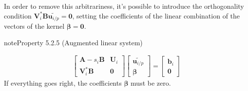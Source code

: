 \documentclass[letterpaper,10pt,english]{jupyterBook}
\begin{document}
\sphinxAtStartPar
In order to remove this arbitrariness, it’s possible to introduce the orthogonality condition \(\mathbf{V}_i^* \mathbf{B} \widetilde{\mathbf{u}_{i/p}} = \mathbf{0}\), setting the coefficients of the linear combination of the vectors of the kernel \(\boldsymbol\beta = \mathbf{0}\).
\label{ch/linear-algebra/spectral-sensitivity:property-4}
\begin{sphinxadmonition}{note}{Property 5.2.5 (Augmented linear system)}


\begin{equation*}
\begin{split}\begin{bmatrix} \mathbf{A} - s_i \mathbf{B} &  \mathbf{U}_i \\ \mathbf{V}_i^* \mathbf{B} & \mathbf{0} \end{bmatrix}
 \begin{bmatrix} \widetilde{\mathbf{u}_{i/p}} \\ \boldsymbol{\beta} \end{bmatrix} = \begin{bmatrix} \mathbf{b}_i \\ \mathbf{0} \end{bmatrix}
\end{split}
\end{equation*}
\sphinxAtStartPar
If everything goes right, the coefficients \(\boldsymbol{\beta}\) must be zero.
\end{sphinxadmonition}
\label{ch/linear-algebra/spectral-sensitivity:property-5}
\end{document}
